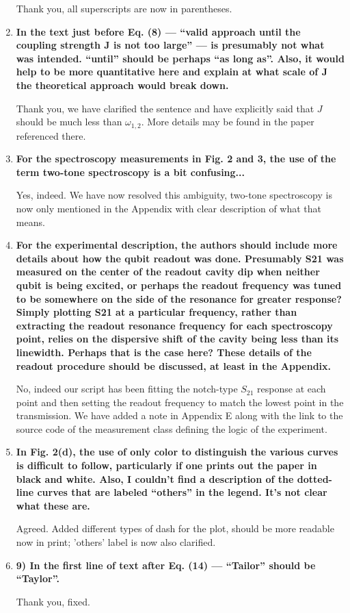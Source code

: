 \documentclass{article}
\begin{document}
\begin{enumerate}
Thank you, all superscripts are now in parentheses.

\item \textbf{In the text just before Eq. (8) — “valid approach until the
	coupling strength J is not too large” — is presumably not what was
	intended. “until” should be perhaps “as long as”. Also, it would help
	to be more quantitative here and explain at what scale of J the
	theoretical approach would break down.}

Thank you, we have clarified the sentence and have explicitly said that $J$ should be much less than $\omega_{1,2}$. More details may be found in the paper referenced there.

\item \textbf{For the spectroscopy measurements in Fig. 2 and 3, the use of the
	term two-tone spectroscopy is a bit confusing...}

Yes, indeed. We have now resolved this ambiguity, two-tone spectroscopy is now only mentioned in the Appendix with clear description of what that means.

\item \textbf{For the experimental description, the authors should include more
	details about how the qubit readout was done. Presumably S21 was
	measured on the center of the readout cavity dip when neither qubit is
	being excited, or perhaps the readout frequency was tuned to be
	somewhere on the side of the resonance for greater response? Simply
	plotting S21 at a particular frequency, rather than extracting the
	readout resonance frequency for each spectroscopy point, relies on the
	dispersive shift of the cavity being less than its linewidth. Perhaps
	that is the case here? These details of the readout procedure should
	be discussed, at least in the Appendix.}

No, indeed our script has been fitting the notch-type $S_{21}$ response at each point and then setting the readout frequency to match the lowest point in the transmission. We have added a note in Appendix E along with the link to the source code of the measurement class defining the logic of the experiment.

\item \textbf{ In Fig. 2(d), the use of only color to distinguish the various
	curves is difficult to follow, particularly if one prints out the
	paper in black and white. Also, I couldn’t find a description of the
	dotted-line curves that are labeled “others” in the legend. It’s not
	clear what these are.}

Agreed. Added different types of dash for the plot, should be more readable now in print; 'others' label is now also clarified.

\item \textbf{9) In the first line of text after Eq. (14) — “Tailor” should be
	“Taylor”.}

Thank you, fixed.

\end{enumerate}
\end{document}
